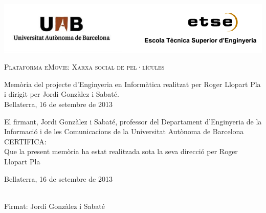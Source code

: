 \documentclass[a4paper,12pt,catalan]{book}
\begin{document}

\pagestyle{plain}
\thispagestyle{empty}

\vspace{0.39cm}
\begin{flushright}
\includegraphics[width=\textwidth]{figs/logos.png}
\end{flushright}
\vspace{0.39cm}

\vfill{}

{\par\centering \textsc{\Large Plataforma eMovie: Xarxa social de pel·lícules}\par}
\vfill{}

\begin{flushright}
\begin{minipage}[b]{0.5\textwidth}

Memòria del projecte d'Enginyeria en Informàtica realitzat per Roger Llopart Pla i dirigit per Jordi Gonzàlez i Sabaté.\\

Bellaterra, 16 de setembre de 2013
\end{minipage}
\end{flushright}
\vfill{}

\cleardoublepage
\vspace*{6 true cm} \begin{center} \begin{minipage}{4in}
\parindent=0pt El firmant, Jordi Gonzàlez i Sabaté, professor del Departament d'Enginyeria de la Informació i de les Comunicacions de la Universitat Autònoma de Barcelona \\

CERTIFICA:\\

Que la present memòria ha estat realitzada sota la seva direcció per
Roger Llopart Pla \par \vspace*{.5in} Bellaterra, 16 de setembre de 2013
\vspace*{.5in}
\begin{center} \vrule width 3in height 0.4pt\\Firmat: Jordi Gonzàlez i Sabaté
\end{center} \end{minipage} \end{center}
\end{document}
